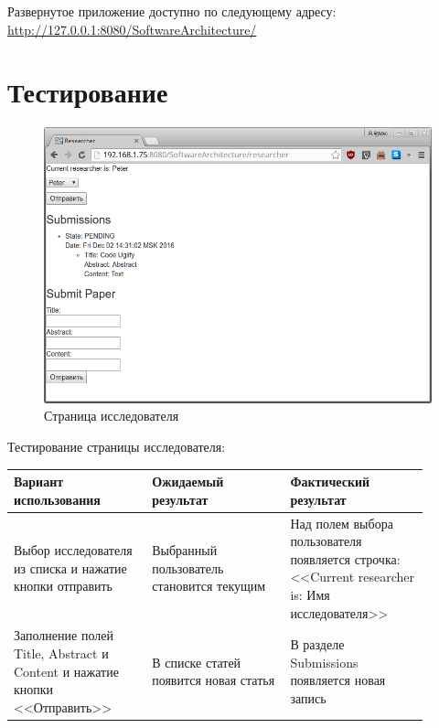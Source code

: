 Развернутое приложение доступно по следующему адресу: \\ \url{http://127.0.0.1:8080/SoftwareArchitecture/}

\section{Тестирование}
\begin{figure}[H]
\centering
\includegraphics[width=\textwidth]{researcher.png}
\caption{Страница исследователя}
\end{figure}
Тестирование страницы исследователя:
\begin{center}
	\begin{longtable}{|p{0.3\linewidth}|p{0.3\linewidth}|p{0.3\linewidth}|}
		\hline
		\textbf{Вариант использования} & \textbf{Ожидаемый результат}&
		\textbf{Фактический результат}\\
		\hline
		Выбор исследователя из списка и нажатие кнопки отправить & Выбранный пользователь становится текущим & Над полем выбора пользователя появляется строчка: <<Current researcher is: Имя исследователя>> \\
		\hline
		Заполнение полей Title, Abstract и Content и нажатие кнопки <<Отправить>> & В списке статей появится новая статья & В разделе Submissions появляется новая запись \\
		\hline
	\end{longtable}
\end{center}

